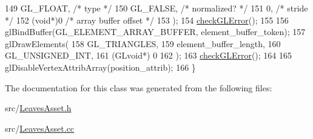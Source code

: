 \begin{DoxyCode}
149     GL\_FLOAT,   \textcolor{comment}{/* type */}
150     GL\_FALSE,   \textcolor{comment}{/* normalized? */}
151     0,        \textcolor{comment}{/* stride */}
152     (\textcolor{keywordtype}{void}*)0    \textcolor{comment}{/* array buffer offset */}
153   );
154   \hyperlink{LeavesAsset_8cc_a75f201b0e53e68726854997957322b8d}{checkGLError}();
155 
156   glBindBuffer(GL\_ELEMENT\_ARRAY\_BUFFER, element\_buffer\_token);
157   glDrawElements(
158     GL\_TRIANGLES,
159     element\_buffer\_length,
160     GL\_UNSIGNED\_INT,
161     (GLvoid*) 0
162   );
163   \hyperlink{LeavesAsset_8cc_a75f201b0e53e68726854997957322b8d}{checkGLError}();
164 
165   glDisableVertexAttribArray(position\_attrib);
166 \}
\end{DoxyCode}


The documentation for this class was generated from the following files\+:\begin{DoxyCompactItemize}
\item 
src/\hyperlink{LeavesAsset_8h}{Leaves\+Asset.\+h}\item 
src/\hyperlink{LeavesAsset_8cc}{Leaves\+Asset.\+cc}\end{DoxyCompactItemize}
